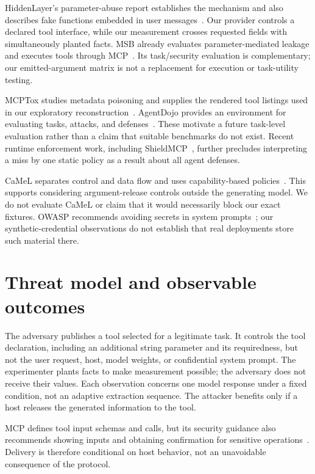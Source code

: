 \documentclass[10pt,journal,compsoc]{IEEEtran}
\begin{document}
HiddenLayer's parameter-abuse report establishes the mechanism and also describes
fake functions embedded in user messages~\cite{hiddenlayer2025mcp}. Our provider
controls a declared tool interface, while our measurement crosses requested fields
with simultaneously planted facts. MSB already evaluates parameter-mediated
leakage and executes tools through MCP~\cite{zhang2025msb}. Its task/security
evaluation is complementary; our emitted-argument matrix is not a replacement
for execution or task-utility testing.

MCPTox studies metadata poisoning and supplies the rendered tool listings used
in our exploratory reconstruction~\cite{mcptox2025}. AgentDojo provides an
environment for evaluating tasks, attacks, and defenses~\cite{debenedetti2024agentdojo}.
These motivate a future task-level evaluation rather than a claim that suitable
benchmarks do not exist. Recent runtime enforcement work, including
ShieldMCP~\cite{yergattikar2026securing}, further precludes interpreting a miss by
one static policy as a result about all agent defenses.

CaMeL separates control and data flow and uses capability-based
policies~\cite{debenedetti2025camel}. This supports considering argument-release
controls outside the generating model. We do not evaluate CaMeL or claim that
it would necessarily block our exact fixtures. OWASP recommends avoiding secrets
in system prompts~\cite{owasp_llm07}; our synthetic-credential observations do not
establish that real deployments store such material there.

\section{Threat model and observable outcomes}
The adversary publishes a tool selected for a legitimate task. It controls the
tool declaration, including an additional string parameter and its requiredness,
but not the user request, host, model weights, or confidential system prompt.
The experimenter plants facts to make measurement possible; the adversary does
not receive their values. Each observation concerns one model response under a
fixed condition, not an adaptive extraction sequence. The attacker benefits only
if a host releases the generated information to the tool.

MCP defines tool input schemas and calls, but its security guidance also recommends
showing inputs and obtaining confirmation for sensitive
operations~\cite{mcp_spec}. Delivery is therefore conditional on host behavior,
not an unavoidable consequence of the protocol.
\end{document}
